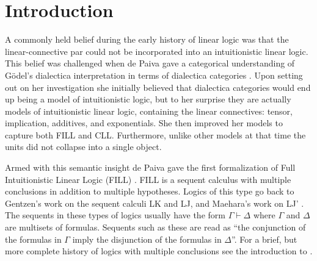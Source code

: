 \section{Introduction}
\label{sec:introduction}

A commonly held belief during the early history of linear logic was
that the linear-connective par could not be incorporated into an
intuitionistic linear logic.  This belief was challenged when de Paiva
gave a categorical understanding of G\"odel's dialectica
interpretation in terms of dialectica categories
\cite{dePaiva:1987,dePaiva:1988}.  Upon setting out on her
investigation she initially believed that dialectica categories would
end up being a model of intuitionistic logic, but to her surprise they
are actually models of intuitionistic linear logic, containing the
linear connectives: tensor, implication, additives, and exponentials.
She then improved her models to capture both FILL and CLL.
Furthermore, unlike other models at that time the units did not
collapse into a single object.

Armed with this semantic insight de Paiva gave the first formalization
of Full Intuitionistic Linear Logic (FILL) \cite{dePaiva:1988}.  FILL
is a sequent calculus with multiple conclusions in addition to
multiple hypotheses.  Logics of this type go back to Gentzen's work on
the sequent calculi LK and LJ, and Maehara's work on LJ'
\cite{Maehara:1954,Takeuti:1975}.  The sequents in these types of
logics usually have the form $\Gamma \vdash \Delta$ where $\Gamma$ and
$\Delta$ are multisets of formulas.  Sequents such as these are read
as ``the conjunction of the formulas in $\Gamma$ imply the disjunction
of the formulas in $\Delta$''.  For a brief, but more complete history
of logics with multiple conclusions see the introduction to
\cite{dePaiva:2005}.

